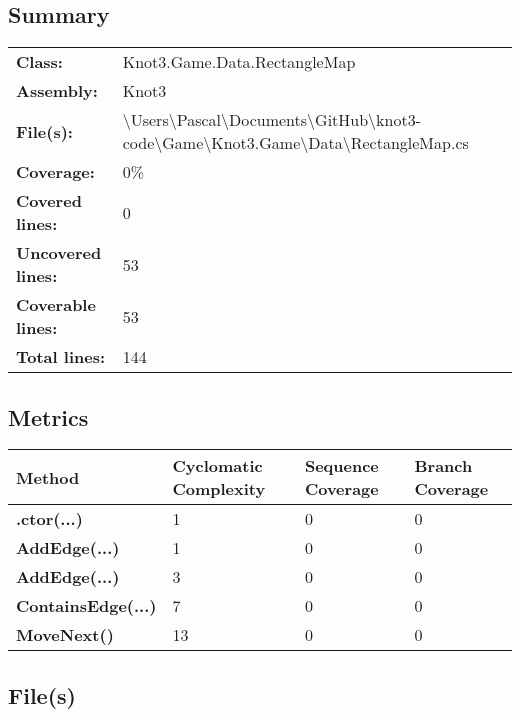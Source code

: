 \documentclass[a4paper,10pt]{article}
\begin{document}
\subsection{Summary}
\begin{longtable}[l]{ll}
\textbf{Class:} & Knot3.Game.Data.RectangleMap\\
\textbf{Assembly:} & Knot3\\
\textbf{File(s):} & \begin{minipage}[t]{12cm}{\textbackslash Users\textbackslash Pascal\textbackslash Documents\textbackslash GitHub\textbackslash knot3-code\textbackslash Game\textbackslash Knot3.Game\textbackslash Data\textbackslash RectangleMap.cs}\end{minipage} \\
\textbf{Coverage:} & 0\%\\
\textbf{Covered lines:} & 0\\
\textbf{Uncovered lines:} & 53\\
\textbf{Coverable lines:} & 53\\
\textbf{Total lines:} & 144\\
\end{longtable}
\subsection{Metrics}
\begin{longtable}[l]{|l|l|l|l|}
\hline
\textbf{Method} & \textbf{Cyclomatic Complexity} & \textbf{Sequence Coverage} & \textbf{Branch Coverage}\\
\hline
\textbf{.ctor(...)} & 1 & 0 & 0\\
\hline
\textbf{AddEdge(...)} & 1 & 0 & 0\\
\hline
\textbf{AddEdge(...)} & 3 & 0 & 0\\
\hline
\textbf{ContainsEdge(...)} & 7 & 0 & 0\\
\hline
\textbf{MoveNext()} & 13 & 0 & 0\\
\hline
\end{longtable}
\subsection{File(s)}
\end{document}
